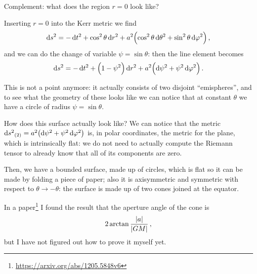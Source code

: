 \documentclass[main.tex]{subfiles}
\begin{document}
\begin{bluebox}
Complement: what does the region \(r=0\) look like? 

Inserting \(r=0\) into the Kerr metric we find 
%
\begin{align}
  \dd{s^2} = - \dd{t^2} + \cos^2\theta \dd{r^2}
  + a^2 \qty(\cos^2 \theta \dd{\theta^2} + \sin^2 \theta \dd{\varphi^2})
\,,
\end{align}
%
and we can do the change of variable \(\psi = \sin \theta \): then the line element becomes 
%
\begin{align}
  \dd{s^2} = - \dd{t^2} + \qty(1 - \psi^2) \dd{r^2} +a^2 \qty(\dd{\psi^2} + \psi^2 \dd{\varphi^2})
\,.
\end{align}

This is not a point anymore: it actually consists of two disjoint ``emispheres'', and to see what the geometry of these looks like we can notice that at constant \(\theta \) we have a circle of radius \(\psi =\sin \theta \).

How does this surface actually look like? We can notice that the metric \(\dd{s^2}_{(2)} = a^2 \qty(\dd{\psi^2}  + \psi^2 \dd{\varphi^2})\) is, in polar coordinates, the metric for the plane, which is intrinsically flat: we do not need to actually compute the Riemann tensor to already know that all of its components are zero. 

Then, we have a bounded surface, made up of circles, which is flat so it can be made by folding a piece of paper; also it is axisymmetric and symmetric with respect to \(\theta  \rightarrow - \theta \): the surface is made up of two cones joined at the equator.

In a paper\footnote{\url{https://arxiv.org/abs/1205.5848v6}} I found the result that the aperture angle of the cone is 
%
\begin{align}
  2 \arctan \frac{\abs{a}}{\abs{GM}}
\,,
\end{align}
%
but I have not figured out how to prove it myself yet. 

\end{bluebox}
\end{document}
